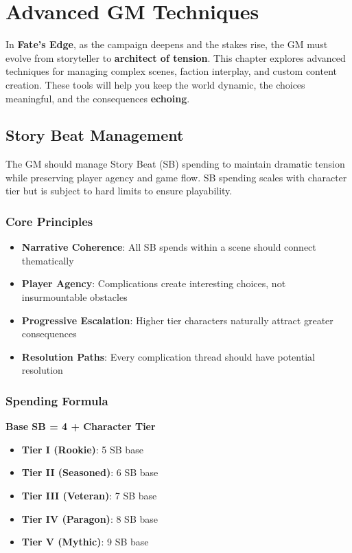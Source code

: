 \chapter{Advanced GM Techniques}

In \textbf{Fate's Edge}, as the campaign deepens and the stakes rise, the GM must evolve from storyteller to \textbf{architect of tension}. This chapter explores advanced techniques for managing complex scenes, faction interplay, and custom content creation. These tools will help you keep the world dynamic, the choices meaningful, and the consequences \textbf{echoing}.

\section{Story Beat Management}

The GM should manage Story Beat (SB) spending to maintain dramatic tension while preserving player agency and game flow. SB spending scales with character tier but is subject to hard limits to ensure playability.

\subsection{Core Principles}
\begin{itemize}
    \item \textbf{Narrative Coherence}: All SB spends within a scene should connect thematically
    \item \textbf{Player Agency}: Complications create interesting choices, not insurmountable obstacles
    \item \textbf{Progressive Escalation}: Higher tier characters naturally attract greater consequences
    \item \textbf{Resolution Paths}: Every complication thread should have potential resolution
\end{itemize}

\subsection{Spending Formula}
\textbf{Base SB = 4 + Character Tier}
\begin{itemize}
    \item \textbf{Tier I (Rookie)}: 5 SB base
    \item \textbf{Tier II (Seasoned)}: 6 SB base
    \item \textbf{Tier III (Veteran)}: 7 SB base
    \item \textbf{Tier IV (Paragon)}: 8 SB base
    \item \textbf{Tier V (Mythic)}: 9 SB base
\end{itemize}

